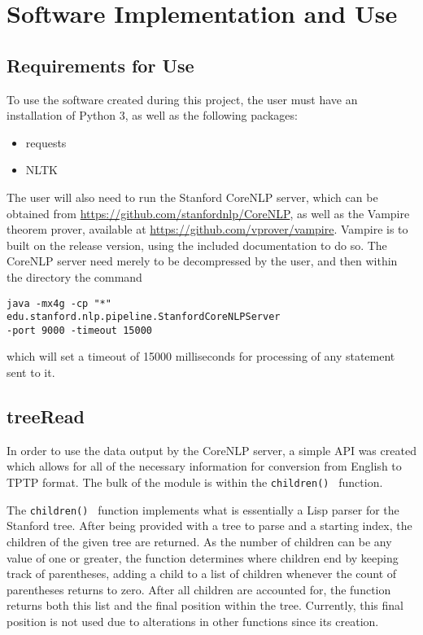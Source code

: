 \chapter{Software Implementation and Use}

\section{Requirements for Use}

To use the software created during this project, the user must have an installation of Python 3, as well as the following packages:
\begin{itemize}
\item requests
\item NLTK
\end{itemize}

The user will also need to run the Stanford CoreNLP server, which can be obtained from \url{https://github.com/stanfordnlp/CoreNLP}, as well as the Vampire theorem prover, available at \url{https://github.com/vprover/vampire}. Vampire is to built on the release version, using the included documentation to do so. The CoreNLP server need merely to be decompressed by the user, and then within the directory the command
\begin{verbatim}
java -mx4g -cp "*"
edu.stanford.nlp.pipeline.StanfordCoreNLPServer
-port 9000 -timeout 15000
\end{verbatim}
which will set a timeout of 15000 milliseconds for processing of any statement sent to it.

\section{treeRead}

In order to use the data output by the CoreNLP server, a simple API was created which allows for all of the necessary information for conversion from English to TPTP format. The bulk of the module is within the \texttt{children() } function.

The \texttt{children() } function implements what is essentially a Lisp parser for the Stanford tree. After being provided with a tree to parse and a starting index, the children of the given tree are returned. As the number of children can be any value of one or greater, the function determines where children end by keeping track of parentheses, adding a child to a list of children whenever the count of parentheses returns to zero. After all children are accounted for, the function returns both this list and the final position within the tree. Currently, this final position is not used due to alterations in other functions since its creation.

